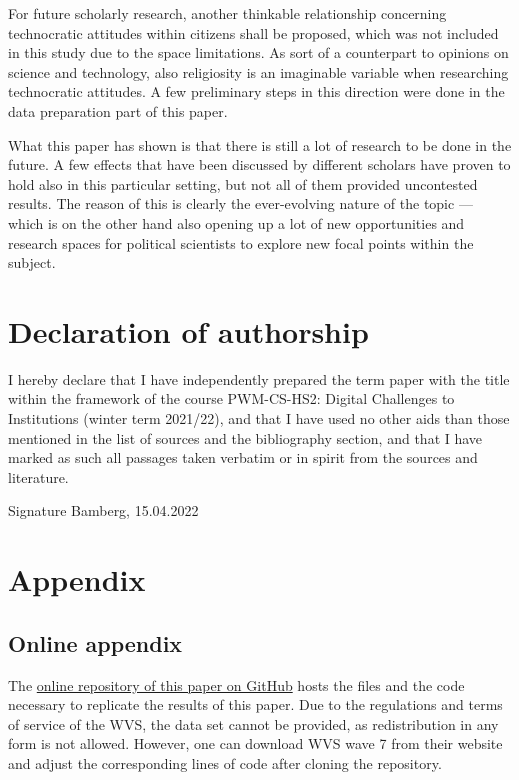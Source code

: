 \documentclass[
  12pt,
  english,
]{article}
\begin{document}
For future scholarly research, another thinkable relationship concerning
technocratic attitudes within citizens shall be proposed, which was not
included in this study due to the space limitations. As sort of a
counterpart to opinions on science and technology, also religiosity is
an imaginable variable when researching technocratic attitudes. A few
preliminary steps in this direction were done in the data preparation
part of this paper.

What this paper has shown is that there is still a lot of research to be
done in the future. A few effects that have been discussed by different
scholars have proven to hold also in this particular setting, but not
all of them provided uncontested results. The reason of this is clearly
the ever-evolving nature of the topic --- which is on the other hand
also opening up a lot of new opportunities and research spaces for
political scientists to explore new focal points within the subject.

\newpage{}

\hypertarget{declaration-of-authorship}{%
\section{Declaration of authorship}\label{declaration-of-authorship}}

I hereby declare that I have independently prepared the term paper with
the title within the framework of the course PWM-CS-HS2: Digital
Challenges to Institutions (winter term 2021/22), and that I have used
no other aids than those mentioned in the list of sources and the
bibliography section, and that I have marked as such all passages taken
verbatim or in spirit from the sources and literature.

\vfill

Signature \hfill Bamberg, 15.04.2022

\newpage{}

\hypertarget{appendix}{%
\section{Appendix}\label{appendix}}

\hypertarget{online-appendix}{%
\subsection{Online appendix}\label{online-appendix}}

The \href{https://github.com/FWisniewski44/digital-challenges}{online
repository of this paper on GitHub} hosts the files and the code
necessary to replicate the results of this paper. Due to the regulations
and terms of service of the WVS, the data set cannot be provided, as
redistribution in any form is not allowed. However, one can download WVS
wave 7 from their website and adjust the corresponding lines of code
after cloning the repository.
\end{document}

